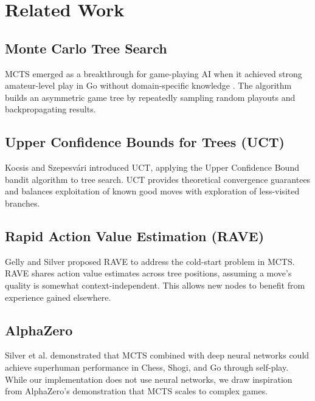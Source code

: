 \documentclass[11pt]{article}
\begin{document}
\section{Related Work}

\subsection{Monte Carlo Tree Search}

MCTS emerged as a breakthrough for game-playing AI when it achieved strong amateur-level play in Go without domain-specific knowledge \cite{coulom2006}. The algorithm builds an asymmetric game tree by repeatedly sampling random playouts and backpropagating results.

\subsection{Upper Confidence Bounds for Trees (UCT)}

Kocsis and Szepesv\'{a}ri \cite{kocsis2006} introduced UCT, applying the Upper Confidence Bound bandit algorithm to tree search. UCT provides theoretical convergence guarantees and balances exploitation of known good moves with exploration of less-visited branches.

\subsection{Rapid Action Value Estimation (RAVE)}

Gelly and Silver \cite{gelly2007} proposed RAVE to address the cold-start problem in MCTS. RAVE shares action value estimates across tree positions, assuming a move's quality is somewhat context-independent. This allows new nodes to benefit from experience gained elsewhere.

\subsection{AlphaZero}

Silver et al. \cite{silver2017} demonstrated that MCTS combined with deep neural networks could achieve superhuman performance in Chess, Shogi, and Go through self-play. While our implementation does not use neural networks, we draw inspiration from AlphaZero's demonstration that MCTS scales to complex games.
\end{document}
